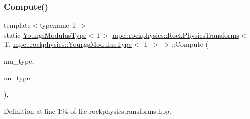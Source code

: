 \subsubsection{\texorpdfstring{Compute()}{Compute()}\hspace{0.1cm}{\footnotesize\ttfamily [5/6]}}
{\footnotesize\ttfamily template$<$typename T $>$ \\
static \mbox{\hyperlink{structmpc_1_1rockphysics_1_1_youngs_modulus_type}{Youngs\+Modulus\+Type}}$<$T$>$ \mbox{\hyperlink{structmpc_1_1rockphysics_1_1_rock_physics_transforms}{mpc\+::rockphysics\+::\+Rock\+Physics\+Transforms}}$<$ T, \mbox{\hyperlink{structmpc_1_1rockphysics_1_1_youngs_modulus_type}{mpc\+::rockphysics\+::\+Youngs\+Modulus\+Type}}$<$ T $>$ $>$\+::Compute (\begin{DoxyParamCaption}\item[{const \mbox{\hyperlink{structmpc_1_1rockphysics_1_1_shear_modulus_type}{mpc\+::rockphysics\+::\+Shear\+Modulus\+Type}}$<$ T $>$ \&}]{mu\+\_\+type,  }\item[{const \mbox{\hyperlink{structmpc_1_1rockphysics_1_1_poissons_ratio_type}{mpc\+::rockphysics\+::\+Poissons\+Ratio\+Type}}$<$ T $>$ \&}]{nu\+\_\+type }\end{DoxyParamCaption})\hspace{0.3cm}{\ttfamily [inline]}, {\ttfamily [static]}}



Definition at line 194 of file rockphysicstransforms.\+hpp.

\mbox{\label{structmpc_1_1rockphysics_1_1_rock_physics_transforms_3_01_t_00_01mpc_1_1rockphysics_1_1_youngs_modulus_type_3_01_t_01_4_01_4_ae9d74f99a514f43ea09d1259ab8d1dbf}} 
